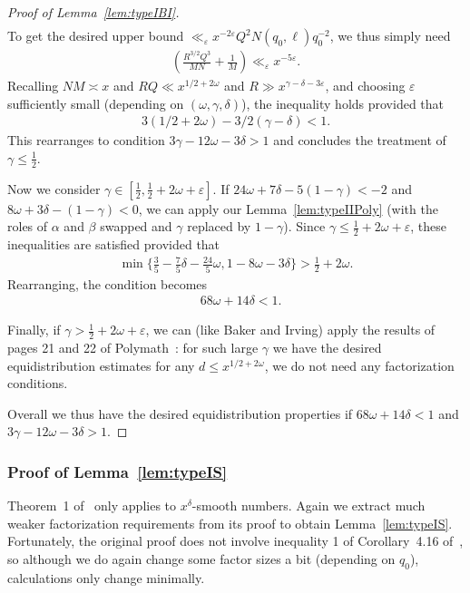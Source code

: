 \documentclass{amsart}
\numberwithin{equation}{section}
\begin{document}
\begin{proof}[Proof of Lemma~\ref{lem:typeIBI}]
\begin{align*}
\end{align*}
To get the desired upper bound $\ll_\varepsilon x^{-2\varepsilon} Q^2N (q_0, \ell) q_0^{-2}$, we thus  simply need
\begin{align*}
    \left( \frac{R^{3/2}Q^3}{ M N}+   \frac{  1}{M}  \right)
\ll_\varepsilon x^{-5\varepsilon}   .  
\end{align*}
Recalling $NM \asymp x$ and $RQ \ll x^{1/2+2\omega}$ and $R \gg x^{\gamma-\delta-3\varepsilon}$, and choosing $\varepsilon$ sufficiently small (depending on $(\omega,\gamma,\delta)$), the inequality holds provided that
\begin{align*}
3(1/2+2\omega) - 3/2(\gamma-\delta ) <1.
\end{align*}
This rearranges to condition $3\gamma-12\omega  -3\delta >1 $ and concludes the treatment of $\gamma \leq \frac{1}{2}$.

\medskip Now we consider $\gamma \in [\frac{1}{2},\frac{1}{2} + 2\omega +\varepsilon]$.    If $24\omega + 7 \delta - 5(1-\gamma) < -2$ and $8 \omega + 3\delta -(1-\gamma)<0$, we can  apply our Lemma~\ref{lem:typeIIPoly} (with the roles of $\alpha$ and $\beta$ swapped and $\gamma$ replaced by $1-\gamma$). Since $\gamma \leq \frac{1}{2} + 2\omega +\varepsilon$, these inequalities are satisfied provided that 
\begin{align*}
\min\{\tfrac{3}{5} - \tfrac{7}{5} \delta  -\tfrac{24}{5}\omega, 1 -8\omega - 3\delta \} > \tfrac{1}{2}+2\omega.
\end{align*}
Rearranging, the condition becomes
\begin{align*}
&68\omega + 14 \delta    <1.
\end{align*}


\medskip Finally, if $\gamma > \frac{1}{2} + 2\omega +\varepsilon$, we can (like Baker and Irving) apply the results of pages 21 and 22 of Polymath~\cite{Polymath:2014:EDZ}:  for such large $\gamma$ we have the desired equidistribution estimates  for any $d \leq x^{1/2+2\omega}$, we do not need any factorization conditions.

\medskip
Overall we thus have the desired equidistribution properties if $68\omega + 14 \delta    <1$ and $3\gamma-12\omega  -3\delta >1 $.
\end{proof} 





\subsubsection{Proof of Lemma~\ref{lem:typeIS}}   Theorem~1 of~\cite{Stadlmann:2023:PAP} only applies to $x^\delta$-smooth numbers. Again we extract much weaker factorization requirements from its proof to obtain Lemma~\ref{lem:typeIS}. Fortunately, the original proof  does not involve  inequality 1 of Corollary~4.16 of~\cite{Polymath:2014:EDZ}, so although we do again change some factor sizes a bit (depending on $q_0$), calculations only change minimally.
\end{document}

